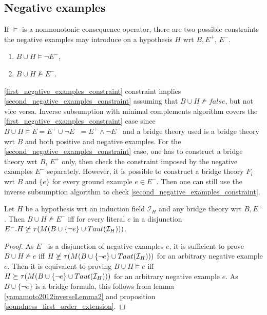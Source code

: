 \subsection{Negative examples}
If $\models$ is a nonmonotonic consequence operator, there are two possible constraints the negative examples may introduce on a hypothesis $H$ wrt $B, E^+$, $E^-$.
\begin{enumerate}
\item\label{first_negative_examples_constraint} $B \cup H \models \neg E^-$,
\item\label{second_negative_examples_constraint} $B \cup H \not\models E^-$.
\end{enumerate}
\ref{first_negative_examples_constraint} constraint implies \ref{second_negative_examples_constraint} assuming that $B \cup H \not\models false$, but not vice versa. Inverse subsumption with minimal complements algorithm covers the \ref{first_negative_examples_constraint} case since $B \cup H \models E = E^+ \cup \neg E^- = E^+ \land \neg E^-$ and a bridge theory used is a bridge theory wrt $B$ and both positive and negative examples. For the \ref{second_negative_examples_constraint} case, one has to construct a bridge theory wrt $B$, $E^+$ only, then check the constraint imposed by the negative examples $E^-$ separately. However, it is possible to construct a bridge theory $F_i$ wrt $B$ and $\{e\}$ for every ground example $e \in E^-$. Then one can still use the inverse subsumption algorithm to check \ref{second_negative_examples_constraint}.

\begin{proposition}\label{proposition_negative_examples_subsumption}
Let $H$ be a hypothesis wrt an induction field $\mathcal{I}_H$ and any bridge theory wrt $B, E^+$. Then $B \cup H \not\models E^-$ iff for every literal $e$ in a disjunction $E^-. H \not\succeq \tau(M(B \cup \{\neg e\} \cup Taut(\mathcal{I}_H)))$.
\end{proposition}
\begin{proof}
As $E^-$ is a disjunction of negative examples $e$, it is sufficient to prove
$B \cup H \not\models e$ iff
$H \not\succeq \tau(M(B \cup \{\neg e\} \cup Taut(\mathcal{I}_H)))$ for an arbitrary negative example $e$. Then it is equivalent to proving
$B \cup H \models e$ iff $H \succeq \tau(M(B \cup \{\neg e\} \cup Taut(\mathcal{I}_H)))$ for an arbitrary negative example $e$. As $B \cup \{\neg e\}$ is a bridge formula, this follows from lemma \ref{yamamoto2012inverseLemma2} and proposition \ref{soundness_first_order_extension}.
\end{proof}

